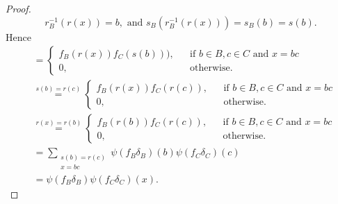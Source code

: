 \documentclass[11pt, a4paper]{amsart}
\theoremstyle{plain}
\begin{document}
\begin{proof}
  $$ r_B^{-1}(r(x))=b, \text{ and } s_B(r_B^{-1} (r(x)))= s_B(b)=s(b). $$
Hence 
\begin{align*}
     & = \left\lbrace \begin{array}{lcl}
           f_B(r(x))f_C(s(b))), & & \mbox{if} \,\, b \in B, c \in C  \,\, \mbox{and} \,\, x=bc  \\
                             0, & & \mbox{otherwise.}
           \end{array}\right.\\
       & \stackrel{s(b)=r(c)}{=} \left\lbrace \begin{array}{lcl}
                                 f_B(r(x))f_C(r(c)), & & \mbox{if} \,\, b \in B, c \in C  \,\, \mbox{and} \,\, x=bc  \\
                                                  0, & & \mbox{otherwise.}
                                 \end{array}\right.\\
       & \stackrel{r(x)=r(b)}{=} \left\lbrace \begin{array}{lcl}
                                 f_B(r(b))f_C(r(c)), & & \mbox{if} \,\, b \in B, c \in C  \,\, \mbox{and} \,\, x=bc  \\
                                                  0, & & \mbox{otherwise.}
                                 \end{array}\right.\\                                
       & = \sum_{\begin{array}{c}
                 s(b)=r(c) \\
                 x=bc
                 \end{array}} \psi(f_B\delta_B)(b)\psi(f_C \delta_C)(c)\\
       & = \psi(f_B \delta_B)\psi(f_C \delta_C)(x).
\end{align*}


\end{proof}
\end{document}
